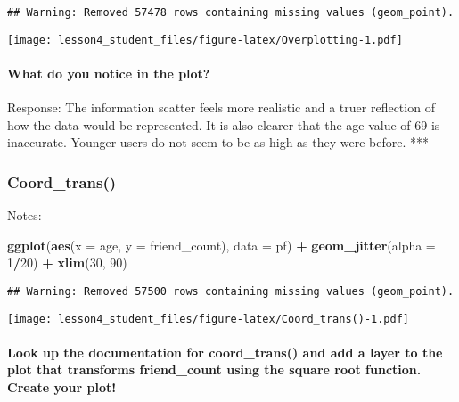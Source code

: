\documentclass[]{article}
\newenvironment{Shaded}{\begin{snugshade}}{\end{snugshade}}
\newcommand{\KeywordTok}[1]{\textcolor[rgb]{0.13,0.29,0.53}{\textbf{#1}}}
\newcommand{\DataTypeTok}[1]{\textcolor[rgb]{0.13,0.29,0.53}{#1}}
\newcommand{\DecValTok}[1]{\textcolor[rgb]{0.00,0.00,0.81}{#1}}
\newcommand{\StringTok}[1]{\textcolor[rgb]{0.31,0.60,0.02}{#1}}
\newcommand{\OperatorTok}[1]{\textcolor[rgb]{0.81,0.36,0.00}{\textbf{#1}}}
\newcommand{\NormalTok}[1]{#1}
\let\oldparagraph\paragraph
\renewcommand{\paragraph}[1]{\oldparagraph{#1}\mbox{}}
\begin{document}
\begin{verbatim}
## Warning: Removed 57478 rows containing missing values (geom_point).
\end{verbatim}

\texttt{[image: lesson4\_student\_files/figure-latex/Overplotting-1.pdf]}

\paragraph{What do you notice in the
plot?}\label{what-do-you-notice-in-the-plot}

Response: The information scatter feels more realistic and a truer
reflection of how the data would be represented. It is also clearer that
the age value of 69 is inaccurate. Younger users do not seem to be as
high as they were before. ***

\subsubsection{Coord\_trans()}\label{coord_trans}

Notes:

\begin{Shaded}
\begin{Highlighting}[]
\KeywordTok{ggplot}\NormalTok{(}\KeywordTok{aes}\NormalTok{(}\DataTypeTok{x =}\NormalTok{ age, }\DataTypeTok{y =}\NormalTok{ friend_count), }\DataTypeTok{data =}\NormalTok{ pf) }\OperatorTok{+}
\StringTok{  }\KeywordTok{geom_jitter}\NormalTok{(}\DataTypeTok{alpha =} \DecValTok{1}\OperatorTok{/}\DecValTok{20}\NormalTok{) }\OperatorTok{+}\StringTok{ }
\StringTok{  }\KeywordTok{xlim}\NormalTok{(}\DecValTok{30}\NormalTok{, }\DecValTok{90}\NormalTok{)}
\end{Highlighting}
\end{Shaded}

\begin{verbatim}
## Warning: Removed 57500 rows containing missing values (geom_point).
\end{verbatim}

\texttt{[image: lesson4\_student\_files/figure-latex/Coord\_trans()-1.pdf]}

\paragraph{Look up the documentation for coord\_trans() and add a layer
to the plot that transforms friend\_count using the square root
function. Create your
plot!}\label{look-up-the-documentation-for-coord_trans-and-add-a-layer-to-the-plot-that-transforms-friend_count-using-the-square-root-function.-create-your-plot}
\end{document}
